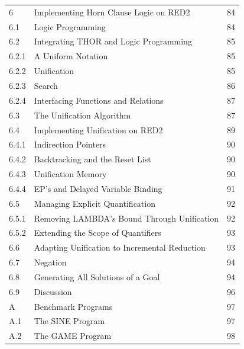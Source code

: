 \clearpage
\thispagestyle{plain}
\begin{tabular}{@{}p{0.75in}p{4.35in}r@{}}
6 & Implementing Horn Clause Logic on RED2 & 84\\
6.1 & Logic Programming & 84\\
6.2 & Integrating THOR and Logic Programming & 85\\
6.2.1 & A Uniform Notation & 85\\
6.2.2 & Unification & 85\\
6.2.3 & Search & 86\\
6.2.4 & Interfacing Functions and Relations & 87\\
6.3 & The Unification Algorithm & 87\\
6.4 & Implementing Unification on RED2 & 89\\
6.4.1 & Indirection Pointers & 90\\
6.4.2 & Backtracking and the Reset List & 90\\
6.4.3 & Unification Memory & 90\\
6.4.4 & EP's and Delayed Variable Binding & 91\\
6.5 & Managing Explicit Quantification & 92\\
6.5.1 & Removing LAMBDA's Bound Through Unification & 92\\
6.5.2 & Extending the Scope of Quantifiers & 93\\
6.6 & Adapting Unification to Incremental Reduction & 93\\
6.7 & Negation & 94\\
6.8 & Generating All Solutions of a Goal & 94\\
6.9 & Discussion & 96\\[0.3em]
A & Benchmark Programs & 97\\
A.1 & The SINE Program & 97\\
A.2 & The GAME Program & 98\\
\end{tabular}
